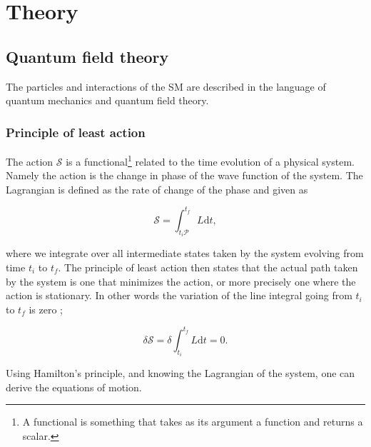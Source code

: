 \section{Theory}
\subsection{Quantum field theory}
The particles and interactions of the SM are described in the language of quantum mechanics and quantum field theory.

\subsubsection{Principle of least action}
The action $\mathcal{S}$ is a functional\footnote{A functional is something that takes as its argument a function and returns a scalar.} related to the time evolution of a physical system. Namely the action is the change in phase of the wave function of the system. The Lagrangian is defined as the rate of change of the phase and given as

\begin{equation}
	\mathcal{S} = \int_{t_i \mathcal{P}}^{t_f} L \textrm{d}t,
\end{equation}

where we integrate over all intermediate states taken by the system evolving from time $t_i$ to $t_f$. The principle of least action then states that the actual path taken by the system is one that minimizes the action, or more precisely one where the action is stationary. In other words the variation of the line integral going from $t_i$ to $t_f$ is zero \cite{goldstein1959};

\begin{equation}
	\delta \mathcal{S} = \delta \int_{t_i}^{t_f} L \textrm{d}t = 0.
\end{equation}

Using Hamilton's principle, and knowing the Lagrangian of the system, one can derive the equations of motion.

